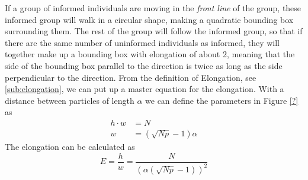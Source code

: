 If a group of informed individuals are moving in the \emph{front line} of the group, these informed group will walk in a circular shape, making a quadratic bounding box surrounding them. 
The rest of the group will follow the informed group, so that if there are the same number of uninformed individuals as informed, they will together make up a bounding box with elongation of about 2, meaning that the side of the bounding box parallel to the direction is twice as long as the side perpendicular to the direction.
From the definition of Elongation, see \ref{sub:elongation}, we can put up a master equation for the elongation. With a distance between particles of length $\alpha$ we can define the parameters in Figure \ref{?} as
\begin{align}
	h\cdot w &= N \\
	w &= (\sqrt{Np}-1)\alpha
\end{align}
The elongation can be calculated as 
\begin{equation}
	E = \frac{h}{w} = \frac{N}{(\alpha(\sqrt{Np}-1))^2}
\end{equation}
